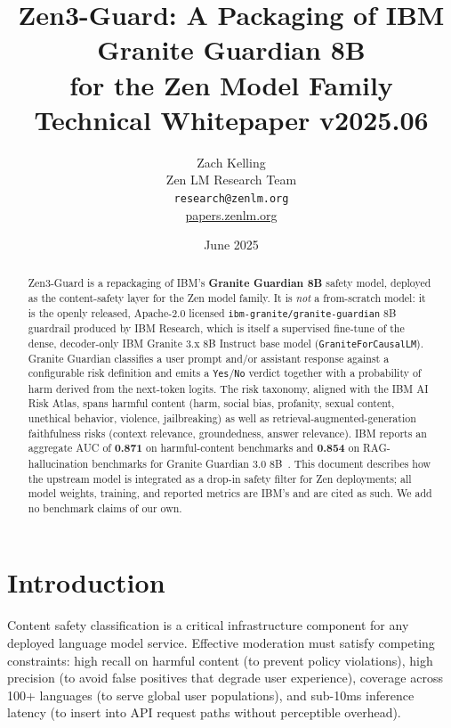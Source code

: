 \documentclass[11pt,a4paper]{article}
\title{\textbf{Zen3-Guard: A Packaging of IBM Granite Guardian 8B\\
for the Zen Model Family}\\
\large Technical Whitepaper v2025.06}
\author{Zach Kelling \\ Zen LM Research Team\\
\texttt{research@zenlm.org}\\
\href{https://papers.zenlm.org}{papers.zenlm.org}}
\date{June 2025}
\begin{document}
\maketitle

\begin{abstract}
Zen3-Guard is a repackaging of IBM's \textbf{Granite Guardian 8B} safety model, deployed
as the content-safety layer for the Zen model family. It is \emph{not} a from-scratch
model: it is the openly released, Apache-2.0 licensed \texttt{ibm-granite/granite-guardian}
8B guardrail produced by IBM Research, which is itself a supervised fine-tune of the dense,
decoder-only IBM Granite 3.x 8B Instruct base model (\texttt{GraniteForCausalLM}). Granite
Guardian classifies a user prompt and/or assistant response against a configurable risk
definition and emits a \texttt{Yes}/\texttt{No} verdict together with a probability of harm
derived from the next-token logits. The risk taxonomy, aligned with the IBM AI Risk Atlas,
spans harmful content (harm, social bias, profanity, sexual content, unethical behavior,
violence, jailbreaking) as well as retrieval-augmented-generation faithfulness risks
(context relevance, groundedness, answer relevance). IBM reports an aggregate AUC of
\textbf{0.871} on harmful-content benchmarks and \textbf{0.854} on RAG-hallucination
benchmarks for Granite Guardian 3.0 8B~\cite{graniteguardian}. This document describes how
the upstream model is integrated as a drop-in safety filter for Zen deployments; all model
weights, training, and reported metrics are IBM's and are cited as such. We add no
benchmark claims of our own.
\end{abstract}

\tableofcontents
\newpage

\section{Introduction}
\label{sec:intro}

Content safety classification is a critical infrastructure component for any deployed
language model service. Effective moderation must satisfy competing constraints:
high recall on harmful content (to prevent policy violations), high precision (to
avoid false positives that degrade user experience), coverage across 100+ languages
(to serve global user populations), and sub-10ms inference latency (to insert into
API request paths without perceptible overhead).
\end{document}
